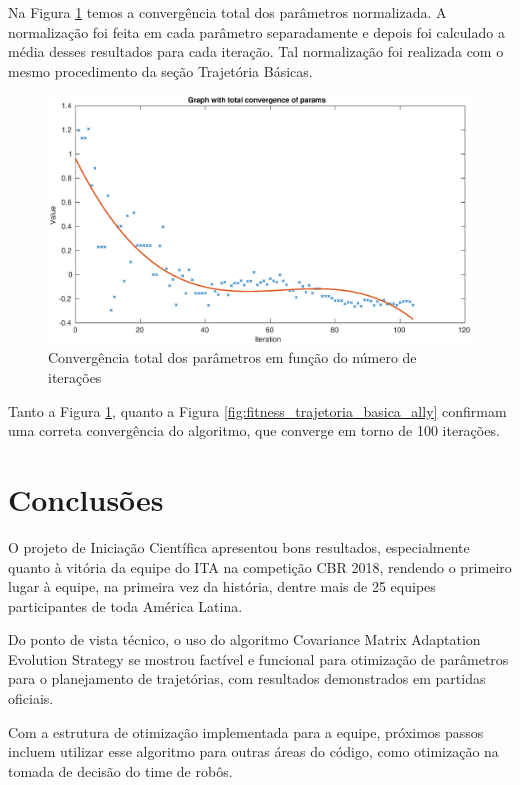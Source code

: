 \documentclass[a4paper,12pt]{article}
\begin{document}
Na Figura \ref{fig:convergencia_total_trajetoria_basica_ally} temos a convergência total dos parâmetros normalizada. A normalização foi feita em cada parâmetro separadamente e depois foi calculado a média desses resultados para cada iteração. Tal normalização foi realizada com o mesmo procedimento da seção Trajetória Básicas.

\begin{figure}[H]
	\centering
	\includegraphics[width=1.0\textwidth]{figures/CMA-ES_Total_parameter_convergence_ally.eps}
	\caption{Convergência total dos parâmetros em função do número de iterações}
	\label{fig:convergencia_total_trajetoria_basica_ally}
\end{figure}

Tanto a Figura \ref{fig:convergencia_total_trajetoria_basica_ally}, quanto a Figura \ref{fig:fitness_trajetoria_basica_ally} confirmam uma correta convergência do algoritmo, que converge em torno de 100 iterações.

\section{Conclusões}

O projeto de Iniciação Científica apresentou bons resultados, especialmente quanto à vitória da equipe do ITA na competição CBR 2018, rendendo o primeiro lugar à equipe, na primeira vez da história, dentre mais de 25 equipes participantes de toda América Latina.

Do ponto de vista técnico, o uso do algoritmo Covariance Matrix Adaptation Evolution Strategy se mostrou factível e funcional para otimização de parâmetros para o planejamento de trajetórias, com resultados demonstrados em partidas oficiais.

Com a estrutura de otimização implementada para a equipe, próximos passos incluem utilizar esse algoritmo para outras áreas do código, como otimização na tomada de decisão do time de robôs.
\end{document}
